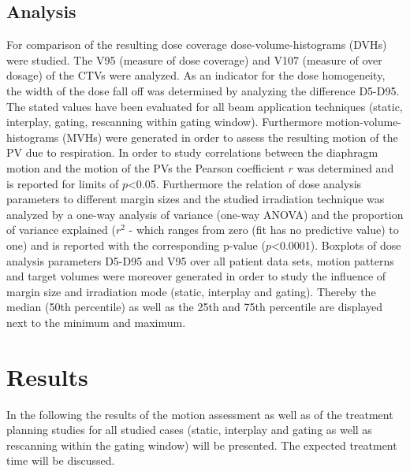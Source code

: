 \subsection{Analysis}

For comparison of the resulting dose coverage dose-volume-histograms (DVHs) were studied. The V95 (measure of dose coverage) and V107 (measure 
of over dosage) of the CTVs were analyzed. As an indicator for the dose homogeneity, the width of the dose fall off was determined by analyzing 
the difference D5-D95. The stated values have been evaluated for all beam application techniques (static, interplay, gating, rescanning within 
gating window). Furthermore motion-volume-histograms (MVHs) were generated in order to assess the resulting motion of the PV due to respiration. \newline
\newline
In order to study correlations between the diaphragm motion and the motion of the PVs the Pearson coefficient $r$ was determined and 
is reported for limits of $p$<0.05. Furthermore the relation of dose analysis parameters to different margin sizes and the studied irradiation 
technique was analyzed by a one-way analysis of variance (one-way ANOVA) and the proportion of variance explained ($r^{2}$ - which ranges from 
zero (fit has no predictive value) to one) and is reported with the corresponding p-value ($p$<0.0001). \newline
\newline
Boxplots of dose analysis parameters D5-D95 and V95 over all patient data sets, motion patterns and target volumes were moreover generated 
in order to study the influence of margin size and irradiation mode (static, interplay and gating). Thereby the median (50th 
percentile) as well as the 25th and 75th percentile are displayed next to the minimum and maximum. 
 

\newpage

\section{Results}

In the following the results of the motion assessment as well as of the treatment planning studies for all studied cases 
(static, interplay and gating as well as rescanning within the gating window) will be presented.  
The expected treatment time will be discussed. 


